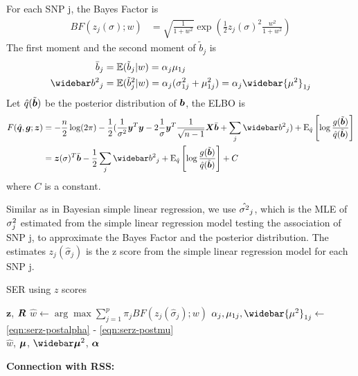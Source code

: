 For each SNP j, the Bayes Factor is
\begin{align} \label{eqn:SERzBFj}
    BF(z_j(\sigma); w) &= \sqrt{\frac{1}{1+w^2}} \exp\left( \frac{1}{2} z_j(\sigma)^2 \frac{w^2}{1+w^2} \right)
\end{align}
The first moment and the second moment of $\tilde{b}_j$ is 
\begin{align}
    \bb_j &= \mathbb{E}(\tilde{b}_j|w) = \alpha_j \mu_{1j} \label{eqn:serz 1st}\\
    \bbb_j &= \mathbb{E}(\tilde{b}_j^2|w) = \alpha_j (\rv_{1j} + \mu_{1j}^2) = \alpha_j \widebar{\mu^2}_{1j} \label{eqn:serz 2nd}
\end{align}
Let $\hat{q}(\tilde{\bm b})$ be the posterior distribution of $\bm b$, the ELBO is
\begin{align}
    F(\hat{\q},\g;\bm{z}) &= -\frac{n}{2} \log(2\pi) - \frac{1}{2}(\frac{1}{\rv}\vy^T\vy - 2 \frac{1}{\sigma}\vy^T\frac{1}{\sqrt{n-1}}\mx \bar{\vb} + \sum_j \bbb_{j}) + \E_{\hat{q}}\left[\log\frac{g(\tilde{\vb})}{\hat{q}(\tilde{\vb})} \right] \\
    &= \bm{z}(\sigma)^{T} \bar{\vb} - \frac{1}{2} \sum_j \bbb_{j} + \E_{\hat{q}}\left[\log\frac{g(\tilde{\vb})}{\hat{q}(\tilde{\vb})}\right] + C\label{eqn:SERzelbo}
\end{align}
where $C$ is a constant.

Similar as in Bayesian simple linear regression, we use $\hat{\sigma^2}_j$, which is the MLE of $\sigma^2_j$ estimated from the simple linear regression model testing the association of SNP j, to approximate the Bayes Factor and the posterior distribution. The estimates $z_j(\hat{\sigma}_j)$ is the z score from the simple linear regression model for each SNP j.

\begin{algorithm}[H] 
\caption{SER using $z$ scores} \label{alg:SERzalg}
\begin{algorithmic}[1]
\Require $\bm{z}$, $\bm R$
\State $\hat{w} \gets \arg \max \sum_{j=1}^{p} \pi_j BF(z_j(\hat{\sigma}_j); w)$  
\State $\alpha_j, \mu_{1j}, \widebar{\mu^2}_{1j} \gets $ \eqref{eqn:serz-postalpha} - \eqref{eqn:serz-postmu}  \\
\Return $\hat{w}$, $\bm \mu$, $\emusq$, $\bm \alpha$
\end{algorithmic}
\end{algorithm}

\textbf{Connection with RSS:}

